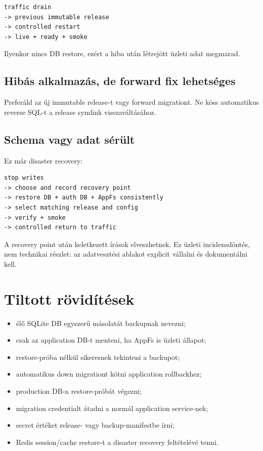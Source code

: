 \begin{lstlisting}
traffic drain
-> previous immutable release
-> controlled restart
-> live + ready + smoke
\end{lstlisting}

Ilyenkor nincs DB restore, ezért a hiba után létrejött üzleti adat megmarad.

\subsection*{Hibás alkalmazás, de forward fix lehetséges}

Preferáld az új immutable release-t vagy forward migrationt. Ne köss automatikus reverse SQL-t a release symlink visszaváltásához.

\subsection*{Schema vagy adat sérült}

Ez már disaster recovery:

\begin{lstlisting}
stop writes
-> choose and record recovery point
-> restore DB + auth DB + AppFs consistently
-> select matching release and config
-> verify + smoke
-> controlled return to traffic
\end{lstlisting}

A recovery point után keletkezett írások elveszhetnek. Ez üzleti incidensdöntés, nem technikai részlet: az adatvesztési ablakot explicit vállalni és dokumentálni kell.

\section{Tiltott rövidítések}

\begin{itemize}
  \item élő SQLite DB egyszerű  másolatát backupnak nevezni;
  \item csak az application DB-t menteni, ha AppFs is üzleti állapot;
  \item restore-próba nélkül sikeresnek tekinteni a backupot;
  \item automatikus down migrationt kötni application rollbackhez;
  \item production DB-n restore-próbát végezni;
  \item migration credentialt átadni a normál application service-nek;
  \item secret értéket release- vagy backup-manifestbe írni;
  \item Redis session/cache restore-t a disaster recovery feltételévé tenni.
\end{itemize}

